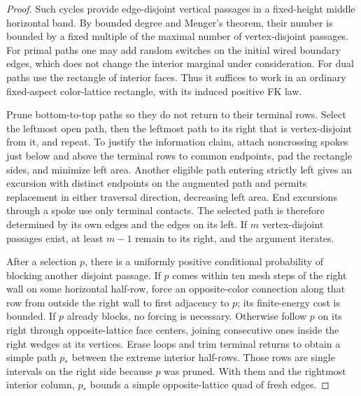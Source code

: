 \begin{proof}
Such cycles provide edge-disjoint vertical passages in a fixed-height
middle horizontal band.  By bounded degree and Menger's theorem,
their number is bounded by a fixed multiple of the maximal number of
vertex-disjoint passages.  For primal paths one may add random switches
on the initial wired boundary edges, which does not change the interior
marginal under consideration.  For dual paths use the rectangle of
interior faces.  Thus it suffices to work in an ordinary fixed-aspect
color-lattice rectangle, with its induced positive FK law.

Prune bottom-to-top paths so they do not return to their terminal rows.
Select the leftmost open path, then the leftmost path to its right that
is vertex-disjoint from it, and repeat.  To justify the information
claim, attach noncrossing spokes just below and above the terminal rows
to common endpoints, pad the rectangle sides, and minimize left area.
Another eligible path entering strictly left gives an excursion with
distinct endpoints on the augmented path and permits replacement in
either traversal direction, decreasing left area.  End excursions
through a spoke use only terminal contacts.  The selected path is
therefore determined by its own edges and the edges on its left.  If
$m$ vertex-disjoint passages exist, at least $m-1$ remain to its right,
and the argument iterates.

After a selection $p$, there is a uniformly positive conditional
probability of blocking another disjoint passage.  If $p$ comes within
ten mesh steps of the right wall on some horizontal half-row, force an
opposite-color connection along that row from outside the right wall
to first adjacency to $p$; its finite-energy cost is bounded.  If $p$
already blocks, no forcing is necessary.  Otherwise follow $p$ on its
right through opposite-lattice face centers, joining consecutive ones
inside the right wedges at its vertices.  Erase loops and trim terminal
returns to obtain a simple path $p_*$ between the extreme interior
half-rows.  Those rows are single intervals on the right side because
$p$ was pruned.  With them and the rightmost interior column, $p_*$
bounds a simple opposite-lattice quad of fresh edges.


\end{proof}
